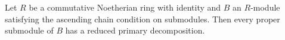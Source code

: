 Let $R$ be a commutative Noetherian ring with identity and $B$ an $R$-module satisfying the ascending chain condition on submodules. Then every proper submodule of $B$ has a reduced primary decomposition.
